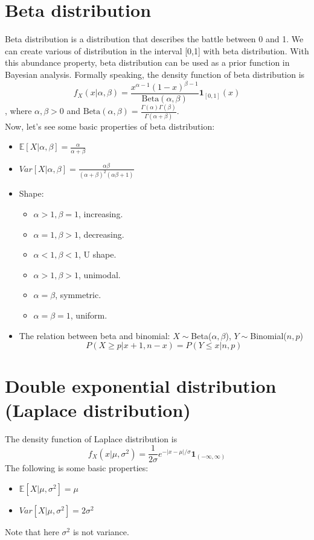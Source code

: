 \documentclass[../Distributions.tex]{subfiles}
\begin{document}
\section{Beta distribution}
Beta distribution is a distribution that describes the battle between 0 and 1. We can create various of distribution in the interval [0,1] with beta distribution. With this abundance property, beta distribution can be used as a prior function in Bayesian analysis. Formally speaking, the density function of beta distribution is
$$f_X(x|\alpha,\beta) = \frac{x^{\alpha-1}(1-x)^{\beta-1}}{\mbox{Beta}(\alpha,\beta)}\mathbf{1}_{[0,1]}(x)$$
, where $\alpha,\beta>0$ and $\mbox{Beta}(\alpha,\beta) = \frac{\Gamma(\alpha)\Gamma(\beta)}{\Gamma(\alpha+\beta)}$.\\
Now, let's see some basic properties of beta distribution:
\begin{itemize}
	\item $\mathbb{E}[X|\alpha,\beta] = \frac{\alpha}{\alpha+\beta}$
	\item $Var[X|\alpha,\beta] = \frac{\alpha\beta}{(\alpha+\beta)^2(\alpha\beta+1)}$
	\item Shape:
	\begin{itemize}
		\item $\alpha>1,\beta=1$, increasing.
		\item $\alpha=1, \beta > 1$, decreasing.
		\item $\alpha<1,\beta<1$, U shape.
		\item $\alpha>1,\beta>1$, unimodal.
		\item $\alpha=\beta$, symmetric.
		\item $\alpha=\beta=1$, uniform.
	\end{itemize}
	\item The relation between beta and binomial: $X\sim$Beta($\alpha,\beta$), $Y\sim$Binomial($n,p$)
	$$P(X\geq p|x+1,n-x) = P(Y\leq x|n,p)$$
\end{itemize}

\section{Double exponential distribution (Laplace distribution)}
The density function of Laplace distribution is
$$f_X(x|\mu,\sigma^2) = \frac{1}{2\sigma}e^{-|x-\mu|/\sigma}\mathbf{1}_{(-\infty,\infty)}$$
The following is some basic properties:
\begin{itemize}
	\item $\mathbb{E}[X|\mu,\sigma^2] = \mu$
	\item $Var[X|\mu,\sigma^2] = 2\sigma^2$
\end{itemize}
Note that here $\sigma^2$ is not variance.
\end{document}
